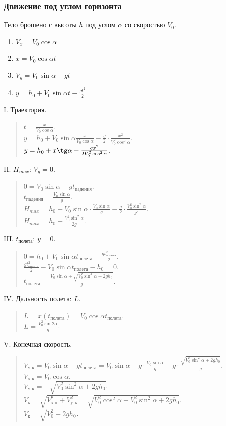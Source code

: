 \documentclass[12pt]{article}
\begin{document}
	\subsubsection{Движение под углом горизонта}
	Тело брошено с высоты $h$ под углом $\alpha$ со скоростью $V_0$.
	\begin{enumerate}
		\item $V_x = V_0 \cos\alpha$
		\item $x = V_0 \cos\alpha t$
		\item $V_y = V_0 \sin\alpha - gt$
		\item $y = h_0 + V_0 \sin\alpha t - \frac{gt^2}{2}$
	\end{enumerate}
	I. Траектория.
	\begin{quote}
		$t = \frac{x}{V_0 \cos\alpha}$.\\
		$y = h_0 + V_0 \sin\alpha \frac{x}{V_0 \cos\alpha} - \frac{g}{2} \cdot \frac{x^2}{V_0^2 \cos^2\alpha}$.\\
		$y = h_0 + x \tg\alpha - \frac{gx^2}{2V_0^2\cos^2\alpha}$.\\
	\end{quote}
	II. $H_{max}$: $V_{y} = 0$.
	\begin{quote}
		$0 = V_0 \sin\alpha - gt_{\text{падения}}$.\\
		$t_{\text{падения}} = \frac{V_0 \sin\alpha}{g}$.\\
		$H_{max} = h_0 + V_0 \sin\alpha \cdot \frac{V_0 \sin\alpha}{g} - \frac{g}{2} \cdot \frac{V_0^2 \sin^2\alpha}{g^2}$.\\
		$H_{max} = h_0 + \frac{V_0^2 \sin^2\alpha}{2g}$.\\
	\end{quote}
	III. $t_{\text{полета}}$: $y = 0$.
	\begin{quote}
		$0 = h_0 + V_0 \sin\alpha t_{\text{полета}} - \frac{gt_{\text{полета}}^2}{2}$.\\
		$\frac{gt_{\text{полета}}^2}{2} - V_0 \sin\alpha t_{\text{полета}} - h_0 = 0$.\\
		$t_{\text{полета}} = \frac{V_0 \sin\alpha + \sqrt{V_0^2\sin^2\alpha + 2gh_0}}{g}$.\\
	\end{quote}
	IV. Дальность полета: $L$.
	\begin{quote}
		$L = x(t_{\text{полета}}) = V_0 \cos\alpha t_{\text{полета}}$.\\
		$L = \frac{V_0^2 \sin2\alpha}{g}$.\\
	\end{quote}
	V. Конечная скорость.
	\begin{quote}
		$V_{\text{y к}} = V_0 \sin\alpha - gt_{\text{полета}} = V_0 \sin\alpha - g \cdot \frac{V_0 \sin\alpha}{g} - g \cdot \frac{\sqrt{V_0^2 \sin^2\alpha + 2gh_0}}{g}$.\\
		$V_{\text{x к}} = V_0 \cos\alpha$.\\
		$V_{\text{y к}} = -\sqrt{V_0^2 \sin^2\alpha + 2gh_0}$.\\
		$V_{\text{к}} = \sqrt{V_{\text{x к}}^2 + V_{\text{y к}}^2} = \sqrt{V_0^2 \cos^2\alpha + V_0^2 \sin^2\alpha + 2gh_0}$.\\
		$V_{\text{к}} = \sqrt{V_0^2 + 2gh_0}$.\\
	\end{quote}
\end{document}

